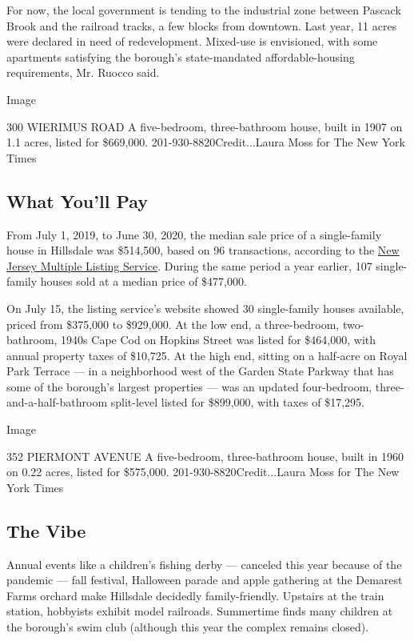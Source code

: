 For now, the local government is tending to the industrial zone between
Pascack Brook and the railroad tracks, a few blocks from downtown. Last
year, 11 acres were declared in need of redevelopment. Mixed-use is
envisioned, with some apartments satisfying the borough's state-mandated
affordable-housing requirements, Mr. Ruocco said.

Image

300 WIERIMUS ROAD \textbar{} A five-bedroom, three-bathroom house, built
in 1907 on 1.1 acres, listed for \$669,000. 201-930-8820Credit...Laura
Moss for The New York Times

\hypertarget{what-youll-pay}{%
\subsection{What You'll Pay}\label{what-youll-pay}}

From July 1, 2019, to June 30, 2020, the median sale price of a
single-family house in Hillsdale was \$514,500, based on 96
transactions, according to the \href{http://www.njmls.com/}{New Jersey
Multiple Listing Service}. During the same period a year earlier, 107
single-family houses sold at a median price of \$477,000.

On July 15, the listing service's website showed 30 single-family houses
available, priced from \$375,000 to \$929,000. At the low end, a
three-bedroom, two-bathroom, 1940s Cape Cod on Hopkins Street was listed
for \$464,000, with annual property taxes of \$10,725. At the high end,
sitting on a half-acre on Royal Park Terrace --- in a neighborhood west
of the Garden State Parkway that has some of the borough's largest
properties --- was an updated four-bedroom, three-and-a-half-bathroom
split-level listed for \$899,000, with taxes of \$17,295.

Image

352 PIERMONT AVENUE \textbar{} A five-bedroom, three-bathroom house,
built in 1960 on 0.22 acres, listed for \$575,000.
201-930-8820Credit...Laura Moss for The New York Times

\hypertarget{the-vibe}{%
\subsection{The Vibe}\label{the-vibe}}

Annual events like a children's fishing derby --- canceled this year
because of the pandemic --- fall festival, Halloween parade and apple
gathering at the Demarest Farms orchard make Hillsdale decidedly
family-friendly. Upstairs at the train station, hobbyists exhibit model
railroads. Summertime finds many children at the borough's swim club
(although this year the complex remains closed).

